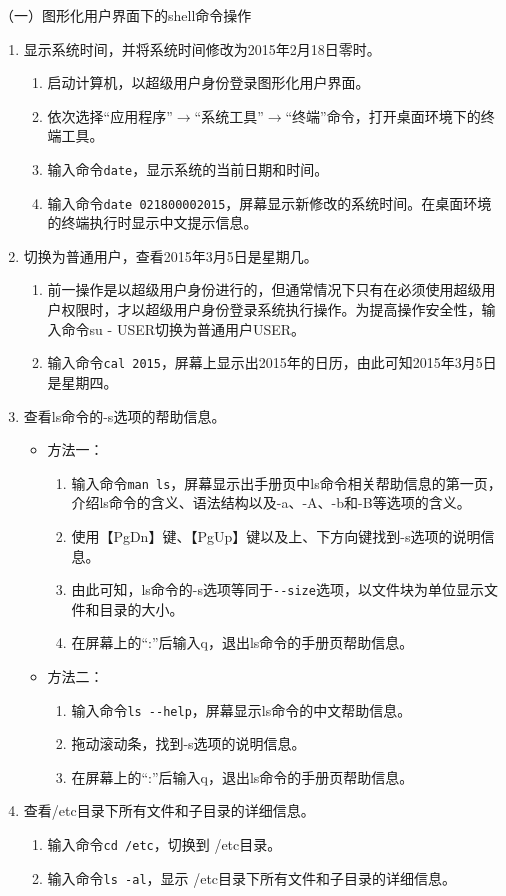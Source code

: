 \vspace{0.1in}
（一）图形化用户界面下的shell命令操作
\begin{enumerate}
  \item 显示系统时间，并将系统时间修改为2015年2月18日零时。
    \begin{enumerate}
      \item 启动计算机，以超级用户身份登录图形化用户界面。
      \item 依次选择“应用程序”$\rightarrow$“系统工具”$\rightarrow$“终端”命令，打开桌面环境下的终端工具。
      \item 输入命令\verb|date|，显示系统的当前日期和时间。
      \item 输入命令\verb|date 021800002015|，屏幕显示新修改的系统时间。在桌面环境的终端执行时显示中文提示信息。
    \end{enumerate}
  \item 切换为普通用户，查看2015年3月5日是星期几。
    \begin{enumerate}
      \item 前一操作是以超级用户身份进行的，但通常情况下只有在必须使用超级用户权限时，才以超级用户身份登录系统执行操作。为提高操作安全性，输入命令su - USER切换为普通用户USER。
      \item 输入命令\verb|cal 2015|，屏幕上显示出2015年的日历，由此可知2015年3月5日是星期四。
    \end{enumerate}
  \item 查看ls命令的-s选项的帮助信息。
    \begin{itemize}
      \item 方法一：
	\begin{enumerate}
	  \item 输入命令\verb|man ls|，屏幕显示出手册页中ls命令相关帮助信息的第一页，介绍ls命令的含义、语法结构以及-a、-A、-b和-B等选项的含义。
	  \item 使用【PgDn】键、【PgUp】键以及上、下方向键找到-s选项的说明信息。
	  \item 由此可知，ls命令的-s选项等同于\verb|--size|选项，以文件块为单位显示文件和目录的大小。
	  \item 在屏幕上的“:”后输入q，退出ls命令的手册页帮助信息。
	\end{enumerate}
      \item 方法二：
	\begin{enumerate}
	  \item 输入命令\verb|ls --help|，屏幕显示ls命令的中文帮助信息。
	  \item 拖动滚动条，找到-s选项的说明信息。
	  \item 在屏幕上的“:”后输入q，退出ls命令的手册页帮助信息。
	\end{enumerate}
    \end{itemize}
  \item 查看/etc目录下所有文件和子目录的详细信息。
    \begin{enumerate}
      \item 输入命令\verb|cd /etc|，切换到 /etc目录。
      \item 输入命令\verb|ls -al|，显示 /etc目录下所有文件和子目录的详细信息。
    \end{enumerate}
\end{enumerate}


